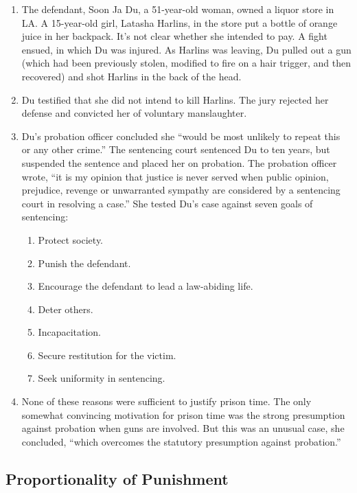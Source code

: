 \begin{enumerate}
    \item The defendant, Soon Ja Du, a 51-year-old woman, owned a liquor store 
    in LA. A 15-year-old girl, Latasha Harlins, in the store put a bottle of 
    orange juice in her backpack. It's not clear whether she intended to pay. 
    A fight ensued, in which Du was injured. As Harlins was leaving, Du pulled 
    out a gun (which had been previously stolen, modified to fire on a hair 
    trigger, and then recovered) and shot Harlins in the back of the head.
    \item Du testified that she did not intend to kill Harlins. The jury 
    rejected her defense and convicted her of voluntary manslaughter.
    \item Du's probation officer concluded she ``would be most unlikely to 
    repeat this or any other crime.'' The sentencing court sentenced Du to ten 
    years, but suspended the sentence and placed her on probation. The 
    probation officer wrote, ``it is my opinion that justice is never served 
    when public opinion, prejudice, revenge or unwarranted sympathy are 
    considered by a sentencing court in resolving a case.'' She tested Du's 
    case against seven goals of sentencing:
    \begin{enumerate}
        \item Protect society.
        \item Punish the defendant.
        \item Encourage the defendant to lead a law-abiding life.
        \item Deter others.
        \item Incapacitation.
        \item Secure restitution for the victim.
        \item Seek uniformity in sentencing.
    \end{enumerate}
    \item None of these reasons were sufficient to justify prison time. The 
    only somewhat convincing motivation for prison time was the strong 
    presumption against probation when guns are involved. But this was an 
    unusual case, she concluded, ``which overcomes the statutory presumption 
    against probation.''
\end{enumerate}

\subsection{Proportionality of Punishment}

